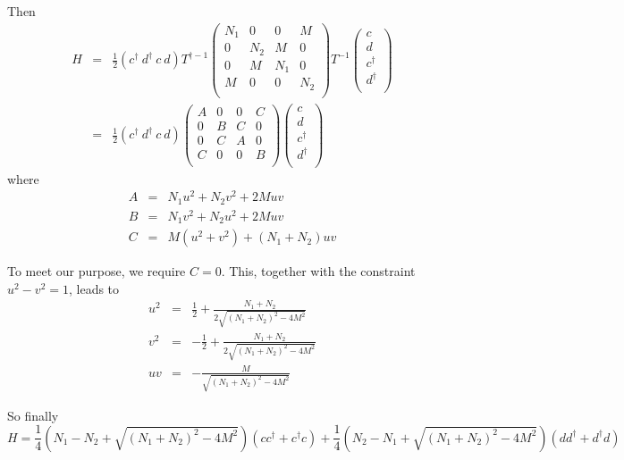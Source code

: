 \documentclass[12pt]{book}
\begin{document}
	Then
	\begin{eqnarray}
		H&=&\frac 12(c^\dagger\ d^\dagger\ c\ d)T^{\dagger-1}
		\left(\begin{array}{cccc}
		N_1&0&0&M\\
		0&N_2&M&0\\
		0&M&N_1&0\\
		M&0&0&N_2\\
		\end{array}\right)
		T^{-1}\left(\begin{array}{c}
		c\\
		d\\
		c^\dagger\\
		d^\dagger\\
		\end{array}\right)\\&=&\frac 12(c^\dagger\ d^\dagger\ c\ d)
		\left(\begin{array}{cccc}
		A&0&0&C\\
		0&B&C&0\\
		0&C&A&0\\
		C&0&0&B\\
		\end{array}\right)
		\left(\begin{array}{c}
		c\\
		d\\
		c^\dagger\\
		d^\dagger\\
		\end{array}\right)		
	\end{eqnarray}
	where
	\begin{eqnarray}
		A&=&N_1u^2+N_2v^2+2Muv\\
		B&=&N_1v^2+N_2u^2+2Muv\\
		C&=&M(u^2+v^2)+(N_1+N_2)uv
	\end{eqnarray}
	
	To meet our purpose, we require $C=0$. This, together with the constraint $u^2-v^2=1$, leads to
	\begin{eqnarray}
		u^2&=&\frac 12 +\frac{N_1+N_2}{2\sqrt{(N_1+N_2)^2-4M^2}}\\		
		v^2&=&-\frac 12 +\frac{N_1+N_2}{2\sqrt{(N_1+N_2)^2-4M^2}}\\		
		uv&=&-\frac{M}{\sqrt{(N_1+N_2)^2-4M^2}}
	\end{eqnarray}
	
	So finally
	\begin{equation}
		H=\frac 14(N_1-N_2+\sqrt{(N_1+N_2)^2-4M^2})(cc^\dagger +c^\dagger c)+\frac 14(N_2-N_1+\sqrt{(N_1+N_2)^2-4M^2})(dd^\dagger +d^\dagger d)
	\end{equation}
\end{document}

